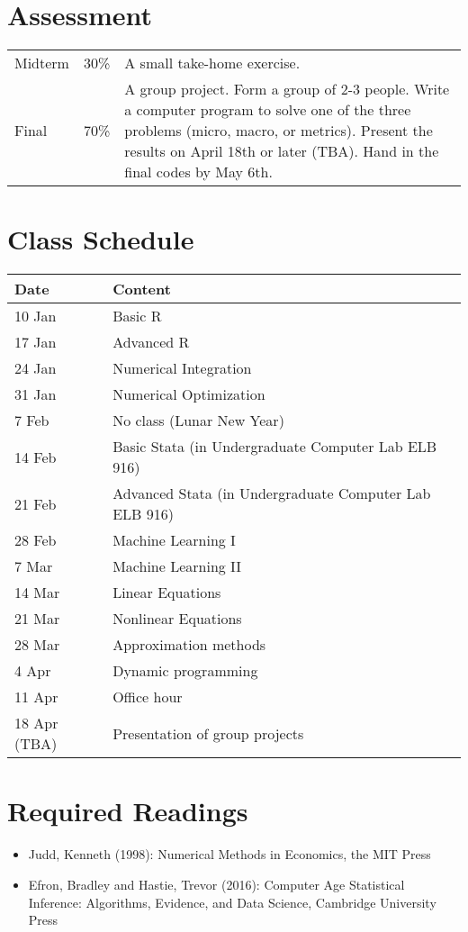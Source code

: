 \documentclass[11pt]{article}
\begin{document}
\section{Assessment}
\begin{tabular}{p{0.5in}p{0.5in}p{5in}}
   Midterm & 30\% & A small take-home exercise. \\
   Final  & 70\%  & A group project. Form a group of 2-3 people. Write a computer program to solve one of the three problems (micro, macro, or metrics). Present the results on April 18th or later (TBA). Hand in the final codes by May 6th.
\end{tabular}

\section{Class Schedule}
\begin{tabular}{p{1in}p{4in}}
  \hline
  Date & Content \\
  \hline
  10 Jan & Basic R \\
  17 Jan & Advanced R \\
  24 Jan & Numerical Integration  \\
  31 Jan & Numerical Optimization  \\
  7 Feb & No class (Lunar New Year)\\
  14 Feb & Basic Stata (in Undergraduate Computer Lab ELB 916) \\
  21 Feb & Advanced Stata (in Undergraduate Computer Lab ELB 916)\\
  28 Feb & Machine Learning I  \\
  7 Mar &  Machine Learning II \\
  14 Mar & Linear Equations \\
  21 Mar & Nonlinear Equations \\
  28 Mar & Approximation methods \\
  4 Apr & Dynamic programming \\
  11 Apr & Office hour \\
  18 Apr (TBA) & Presentation of group projects \\   
  \hline
\end{tabular}


\section{Required Readings}
\begin{itemize}
\item Judd, Kenneth (1998): Numerical Methods in Economics, the MIT Press 
\item Efron, Bradley and Hastie, Trevor (2016): Computer Age Statistical Inference: Algorithms, Evidence, and Data Science, Cambridge University Press
\end{itemize}
\end{document}
